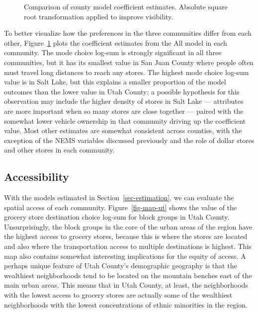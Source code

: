 \documentclass[
  letterpaper,
  number,
  review,
  3p]{elsarticle}
\begin{document}
\begin{figure}


\caption{\label{fig-all-comp}Comparison of county model coefficient
estimates. Absolute square root transformation applied to improve
visibility.}

\end{figure}%

To better visualize how the preferences in the three communities differ
from each other, Figure~\ref{fig-all-comp} plots the coefficient
estimates from the All model in each community. The mode choice log-sum
is strongly significant in all three communities, but it has its
smallest value in San Juan County where people often must travel long
distances to reach any stores. The highest mode choice log-sum value is
in Salt Lake, but this explains a smaller proportion of the model
outcomes than the lower value in Utah County; a possible hypothesis for
this observation may include the higher density of stores in Salt Lake
--- attributes are more important when so many stores are close together
--- paired with the somewhat lower vehicle ownership in that community
driving up the coefficient value. Most other estimates are somewhat
consistent across counties, with the exception of the NEMS variables
discussed previously and the role of dollar stores and other stores in
each community.

\subsection{Accessibility}\label{sec-access}

With the models estimated in Section~\ref{sec-estimation}, we can
evaluate the spatial access of each community. Figure~\ref{fig-map-ut}
shows the value of the grocery store destination choice log-sum for
block groups in Utah County. Unsurprisingly, the block groups in the
core of the urban areas of the region have the highest access to grocery
stores, because this is where the stores are located and also where the
transportation access to multiple destinations is highest. This map also
contains somewhat interesting implications for the equity of access. A
perhaps unique feature of Utah County's demographic geography is that
the wealthiest neighborhoods tend to be located on the mountain benches
east of the main urban areas. This means that in Utah County, at least,
the neighborhoods with the lowest access to grocery stores are actually
some of the wealthiest neighborhoods with the lowest concentrations of
ethnic minorities in the region.
\end{document}
